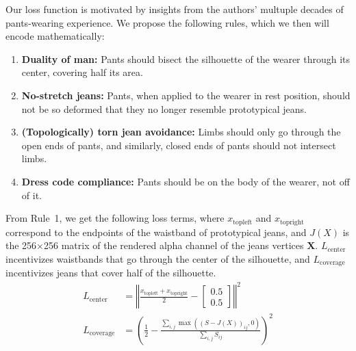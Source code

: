 \documentclass[twocolumn]{article}
\begin{document}
Our loss function is motivated by insights from the authors' multuple decades of pants-wearing experience. We propose the following rules, which we then will encode mathematically:
\begin{enumerate}
    \item \textbf{Duality of man:} Pants should bisect the silhouette of the wearer through its center, covering half its area.
    \item \textbf{No-stretch jeans:} Pants, when applied to the wearer in rest position, should not be so deformed that they no longer resemble prototypical jeans.
    \item \textbf{(Topologically) torn jean avoidance:} Limbs should only go through the open ends of pants, and similarly, closed ends of pants should not intersect limbs.
    \item \textbf{Dress code compliance:} Pants should be on the body of the wearer, not off of it.
\end{enumerate}

From Rule~1, we get the following loss terms, where $x_\text{topleft}$ and $x_\text{topright}$ correspond to the endpoints of the waistband of prototypical jeans, and $J(X)$ is the 256$\times$256 matrix of the rendered alpha channel of the jeans vertices $\mathbf{X}$. $L_\text{center}$ incentivizes waistbands that go through the center of the silhouette, and $L_\text{coverage}$ incentivizes jeans that cover half of the silhouette.
\begin{align}
    L_\text{center} &= \left\Vert \frac{x_\text{topleft} + x_\text{topright}}{2} - \begin{bmatrix}0.5 \\ 0.5\end{bmatrix} \right\Vert^2 \\
    L_\text{coverage} &= \left(\frac{1}{2} - \frac{\sum_{i,j} \max{\left(\left(S - J(X)\right)_{ij}, 0\right)}}{\sum_{i,j} S_{ij}} \right)^2
\end{align}
\end{document}
